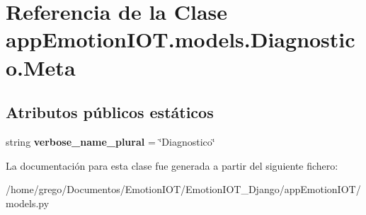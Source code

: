 \hypertarget{classappEmotionIOT_1_1models_1_1Diagnostico_1_1Meta}{}\section{Referencia de la Clase app\+Emotion\+I\+O\+T.\+models.\+Diagnostico.\+Meta}
\label{classappEmotionIOT_1_1models_1_1Diagnostico_1_1Meta}
\subsection*{Atributos públicos estáticos}
\begin{DoxyCompactItemize}
\item 
string {\bfseries verbose\+\_\+name\+\_\+plural} = \char`\"{}Diagnostico\char`\"{}\hypertarget{classappEmotionIOT_1_1models_1_1Diagnostico_1_1Meta_a5073b5d809530eb819bfcbc043a5df53}{}\label{classappEmotionIOT_1_1models_1_1Diagnostico_1_1Meta_a5073b5d809530eb819bfcbc043a5df53}

\end{DoxyCompactItemize}


La documentación para esta clase fue generada a partir del siguiente fichero\+:\begin{DoxyCompactItemize}
\item 
/home/grego/\+Documentos/\+Emotion\+I\+O\+T/\+Emotion\+I\+O\+T\+\_\+\+Django/app\+Emotion\+I\+O\+T/models.\+py\end{DoxyCompactItemize}
